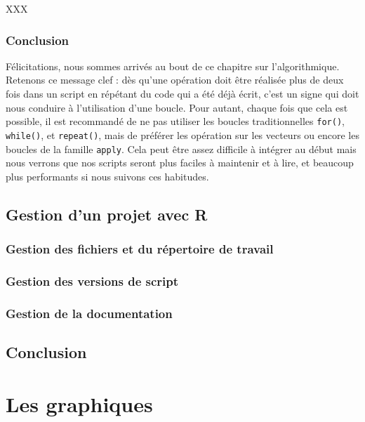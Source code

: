 \documentclass[]{book}
\theoremstyle{definition}
\theoremstyle{definition}
\theoremstyle{definition}
\theoremstyle{remark}
\begin{document}
XXX

\section{Conclusion}\label{conclusion-6}

Félicitations, nous sommes arrivés au bout de ce chapitre sur
l'algorithmique. Retenons ce message clef : dès qu'une opération doit
être réalisée plus de deux fois dans un script en répétant du code qui a
été déjà écrit, c'est un signe qui doit nous conduire à l'utilisation
d'une boucle. Pour autant, chaque fois que cela est possible, il est
recommandé de ne pas utiliser les boucles traditionnelles
\texttt{for()}, \texttt{while()}, et \texttt{repeat()}, mais de préférer
les opération sur les vecteurs ou encore les boucles de la famille
\texttt{apply}. Cela peut être assez difficile à intégrer au début mais
nous verrons que nos scripts seront plus faciles à maintenir et à lire,
et beaucoup plus performants si nous suivons ces habitudes.

\chapter{Gestion d'un projet avec R}\label{project}

\section{Gestion des fichiers et du répertoire de
travail}\label{gestion-des-fichiers-et-du-repertoire-de-travail}

\section{Gestion des versions de
script}\label{gestion-des-versions-de-script}

\section{Gestion de la documentation}\label{gestion-de-la-documentation}

\chapter{Conclusion}\label{concluP1}

\part{Les graphiques}\label{part-les-graphiques}
\end{document}
